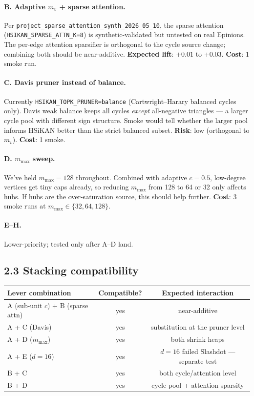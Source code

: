\documentclass[a4paper,11pt]{article}
\begin{document}
\paragraph{B. Adaptive $m_v$ + sparse attention.}  Per
\texttt{project\_sparse\_attention\_synth\_2026\_05\_10}, the sparse
attention (\texttt{HSIKAN\_SPARSE\_ATTN\_K=8}) is synthetic-validated
but untested on real Epinions.  The per-edge attention sparsifier is
orthogonal to the cycle source change; combining both should be
near-additive.  \textbf{Expected lift}: $+0.01$ to $+0.03$.
\textbf{Cost}: 1 smoke run.

\paragraph{C. Davis pruner instead of balance.}  Currently
\texttt{HSIKAN\_TOPK\_PRUNER=balance} (Cartwright--Harary balanced
cycles only).  Davis weak balance keeps all cycles \emph{except}
all-negative triangles — a larger cycle pool with different sign
structure.  Smoke would tell whether the larger pool informs
HSiKAN better than the strict balanced subset.  \textbf{Risk}: low
(orthogonal to $m_v$).  \textbf{Cost}: 1 smoke.

\paragraph{D. $m_\text{max}$ sweep.}  We've held $m_\text{max} = 128$
throughout.  Combined with adaptive $c{=}0.5$, low-degree vertices
get tiny caps already, so reducing $m_\text{max}$ from 128 to 64 or
32 only affects hubs.  If hubs are the over-saturation source, this
should help further.  \textbf{Cost}: 3 smoke runs at $m_\text{max}
\in \{32, 64, 128\}$.

\paragraph{E--H.}  Lower-priority; tested only after A--D land.

\subsection*{2.3 Stacking compatibility}

\begin{center}
\begin{tabular}{lcc}
\toprule
Lever combination & Compatible? & Expected interaction \\
\midrule
A (sub-unit $c$) + B (sparse attn) & yes & near-additive \\
A + C (Davis) & yes & substitution at the pruner level \\
A + D ($m_\text{max}$) & yes & both shrink heaps \\
A + E ($d=16$) & yes & $d=16$ failed Slashdot — separate test \\
B + C & yes & both cycle/attention level \\
B + D & yes & cycle pool + attention sparsity \\
\bottomrule
\end{tabular}
\end{center}
\end{document}
